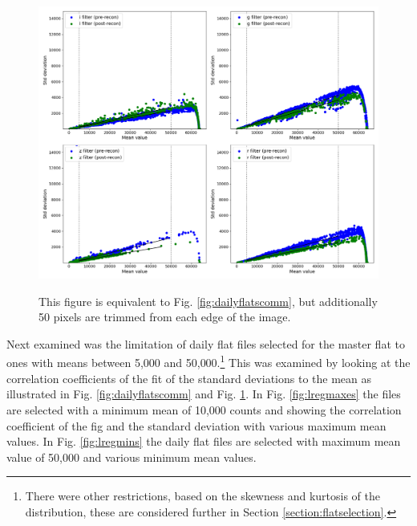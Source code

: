 \begin{figure}[!htbp]
\begin{center}
\includegraphics[scale=0.4]{images/dailyflattrim.png}
\end{center}   
\caption{This figure is equivalent to Fig. \ref{fig:dailyflatscomm}, but
additionally 50 pixels are trimmed from each edge of the image.}
\protect\label{fig:dailyflatstrim}
\end{figure}

\protect\label{section:lincutoff}

Next examined was the limitation of daily flat files selected for the master
flat to ones with means between 5,000 and 50,000.\footnote{There were other
restrictions, based on the skewness and kurtosis of the distribution, these are
considered further in Section \ref{section:flatselection}.} This was examined by
looking at the correlation coefficients of the fit of the standard deviations to the mean as illustrated in Fig.
\ref{fig:dailyflatscomm} and Fig. \ref{fig:dailyflatstrim}. In Fig.
\ref{fig:lregmaxes} the files are selected with a minimum mean of 10,000 counts
and showing the correlation coefficient of the fig and the standard deviation
with various maximum mean values. In Fig. \ref{fig:lregmins} the daily flat
files are selected with  maximum mean value of 50,000 and various minimum mean
values.


